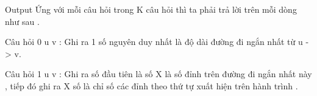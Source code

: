 Output
Ứng với mỗi câu hỏi trong K câu hỏi thì ta phải trả lời trên mỗi dòng như sau .   


   Câu hỏi 0 u v : Ghi ra 1 số nguyên duy nhất là độ dài đường đi ngắn nhất từ u -> v.   


   Câu hỏi 1 u v : Ghi ra số đầu tiên là số X là số đỉnh trên đường đi ngắn nhất này , tiếp đó ghi ra X số là chỉ số các đỉnh theo thứ tự xuất hiện trên hành trình .